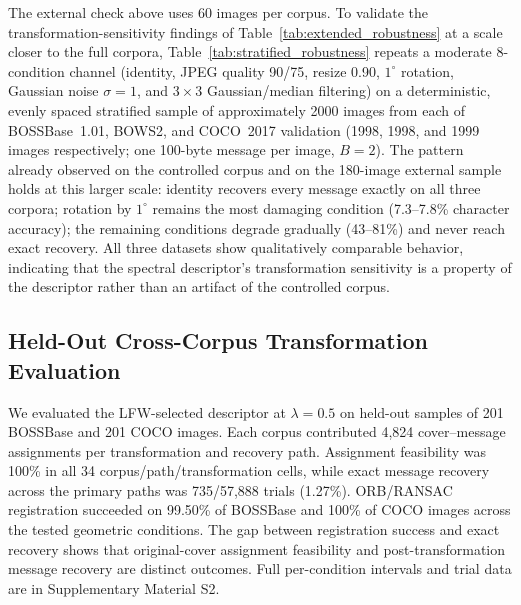 \documentclass[preprint,12pt]{elsarticle}
\theoremstyle{plain}
\begin{document}
The external check above uses 60 images per corpus. To validate the
transformation-sensitivity findings of Table~\ref{tab:extended_robustness} at
a scale closer to the full corpora, Table~\ref{tab:stratified_robustness}
repeats a
moderate 8-condition channel (identity, JPEG quality 90/75, resize 0.90,
$1^\circ$ rotation, Gaussian noise $\sigma=1$, and $3\times3$ Gaussian/median
filtering) on a deterministic, evenly spaced stratified sample of
approximately 2000 images from each of BOSSBase~1.01, BOWS2, and COCO~2017
validation (1998, 1998, and 1999 images respectively; one 100-byte message
per image, $B=2$). The pattern already observed on the controlled corpus and
on the 180-image external sample holds at this larger scale: identity
recovers every message exactly on all three corpora; rotation by $1^\circ$
remains the most damaging condition (7.3--7.8\% character accuracy); the
remaining conditions degrade gradually (43--81\%) and never reach exact
recovery. All three datasets show qualitatively comparable behavior, indicating that
the spectral descriptor's transformation sensitivity is a property of the
descriptor rather than an artifact of the controlled corpus.

\begin{table}[!t]
\centering
\caption{Stratified Robustness Check (100 Bytes, $\approx$2000 Images per Corpus)}
\label{tab:stratified_robustness}

\end{table}

\subsection{Held-Out Cross-Corpus Transformation Evaluation}
\label{sec:heldout_cross_corpus}

We evaluated the LFW-selected descriptor at $\lambda=0.5$ on held-out samples
of 201 BOSSBase and 201 COCO images. Each corpus contributed 4,824
cover--message assignments per transformation and recovery path. Assignment
feasibility was 100\% in all 34 corpus/path/transformation cells, while exact
message recovery across the primary paths was 735/57,888 trials (1.27\%). ORB/RANSAC registration succeeded
on 99.50\% of BOSSBase and 100\% of COCO images across the tested geometric
conditions. The gap between registration success and exact recovery shows that original-cover assignment feasibility and post-transformation message recovery are distinct outcomes. Full per-condition
intervals and trial data are in Supplementary Material S2.
\end{document}
